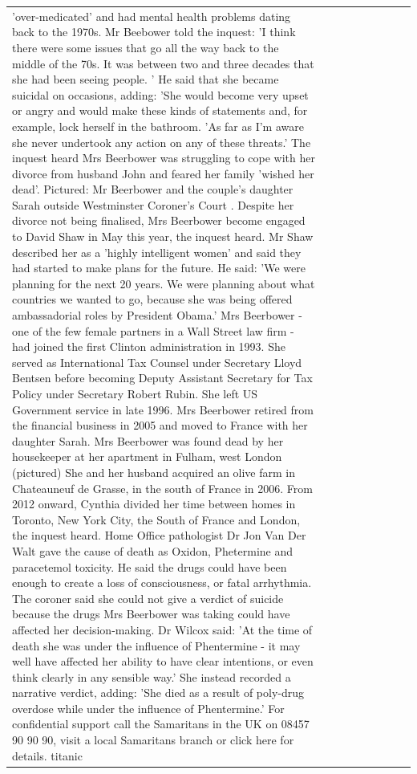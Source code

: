 \begin{table}[H]
\begin{tabular}{lllrlllll}
'over-medicated' and had mental health problems dating back to the 1970s. Mr Beebower told the inquest: 'I think there were some issues that go all the way back to the middle of the 70s. It was between two and three decades that she had been seeing people. ' He said that she became suicidal on occasions, adding: 'She would become very upset or angry and would make these kinds of statements and, for example, lock herself in the bathroom. 'As far as I'm aware she never undertook any action on any of these threats.' The inquest heard Mrs Beerbower was struggling to cope with her divorce from husband John and feared her family 'wished her dead'. Pictured: Mr Beerbower and the couple's daughter Sarah outside Westminster Coroner's Court . Despite her divorce not being finalised, Mrs Beerbower become engaged to David Shaw in May this year, the inquest heard. Mr Shaw described her as a 'highly intelligent women' and said they had started to make plans for the future. He said: 'We were planning for the next 20 years. We were planning about what countries we wanted to go, because she was being offered ambassadorial roles by President Obama.' Mrs Beerbower - one of the few female partners in a Wall Street law firm - had joined the first Clinton administration in 1993. She served as International Tax Counsel under Secretary Lloyd Bentsen before becoming Deputy Assistant Secretary for Tax Policy under Secretary Robert Rubin. She left US Government service in late 1996. Mrs Beerbower retired from the financial business in 2005 and moved to France with her daughter Sarah. Mrs Beerbower was found dead by her housekeeper at her apartment in Fulham, west London (pictured) She and her husband acquired an olive farm in Chateauneuf de Grasse, in the south of France in 2006. From 2012 onward, Cynthia divided her time between homes in Toronto, New York City, the South of France and London, the inquest heard. Home Office pathologist Dr Jon Van Der Walt gave the cause of death as Oxidon, Phetermine and paracetemol toxicity. He said the drugs could have been enough to create a loss of consciousness, or fatal arrhythmia. The coroner said she could not give a verdict of suicide because the drugs Mrs Beerbower was taking could have affected her decision-making. Dr Wilcox said: 'At the time of death she was under the influence of Phentermine - it may well have affected her ability to have clear intentions, or even think clearly in any sensible way.' She instead recorded a narrative verdict, adding: 'She died as a result of poly-drug overdose while under the influence of Phentermine.' For confidential support call the Samaritans in the UK on 08457 90 90 90, visit a local Samaritans branch or click here for details. titanic \\

\end{tabular}
\end{table}
